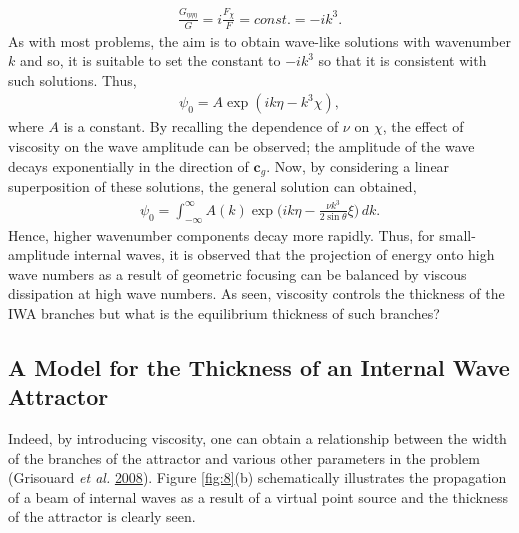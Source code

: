 \documentclass[a4paper]{article}
\numberwithin{equation}{section}
\begin{document}
\begin{align*}
\frac{G_{\eta\eta\eta}}{G} = i\frac{F_{\chi}}{F} = const. = -ik^3.
\end{align*}
As with most problems, the aim is to obtain wave-like solutions with wavenumber $k$ and so, it is suitable to set the constant to $-ik^3$ so that it is consistent with such solutions. Thus,
\begin{align*}
\psi_0 = A\exp(ik\eta -k^3\chi),
\end{align*}
where $A$ is a constant. By recalling the dependence of $\nu$ on $\chi$, the effect of viscosity on the wave amplitude can be observed; the amplitude of the wave decays exponentially in the direction of $\mathbf{c}_g$. Now, by considering a linear superposition of these solutions, the general solution can obtained, 
\begin{align}\label{eq:4.4}
\psi_0 =  \int_{-\infty}^{\infty} A(k) \exp\big( ik\eta - \frac{\nu k^3}{2\sin\theta} \xi \big) \,dk.
\end{align}
Hence, higher wavenumber components decay more rapidly. Thus, for small-amplitude internal waves, it is observed that the projection of energy onto high wave numbers as a result of geometric focusing can be balanced by viscous dissipation at high wave numbers. As seen, viscosity controls the thickness of the IWA branches but what is the equilibrium thickness of such branches?

\subsection{A Model for the Thickness of an Internal Wave Attractor}
\label{sec:4.2}
Indeed, by introducing viscosity, one can obtain a relationship between the width of the branches of the attractor and various other parameters in the problem (Grisouard \emph{et al.} \hyperlink{ref 25}{2008}). Figure \ref{fig:8}(b) schematically illustrates the propagation of a beam of internal waves as a result of a virtual point source and the thickness of the attractor is clearly seen.
\end{document}
